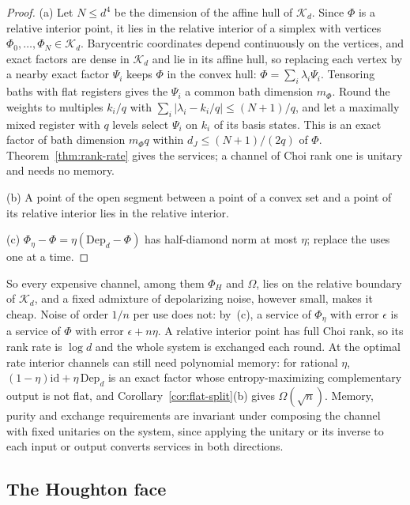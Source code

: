 \documentclass[11pt,a4paper]{article}
\theoremstyle{plain}
\theoremstyle{definition}
\theoremstyle{remark}
\newcommand{\dJ}{d_J}
\begin{document}
\begin{proof}
(a) Let $N\le d^4$ be the dimension of the affine hull of $\mathcal K_d$. Since $\Phi$ is a relative interior point, it lies in the relative
interior of a simplex with vertices $\Phi_0,\dots,\Phi_N\in\mathcal K_d$. Barycentric coordinates depend continuously on the vertices, and exact
factors are dense in $\mathcal K_d$ and lie in its affine hull, so replacing each vertex by a nearby exact factor $\Psi_i$ keeps $\Phi$ in the
convex hull: $\Phi=\sum_i\lambda_i\Psi_i$. Tensoring baths with flat registers gives the $\Psi_i$ a common bath dimension $m_\Phi$. Round the weights
to multiples $k_i/q$ with $\sum_i|\lambda_i-k_i/q|\le(N+1)/q$, and let a maximally mixed register with $q$ levels select $\Psi_i$ on $k_i$ of its basis
states. This is an exact factor of bath dimension $m_\Phi q$ within $\dJ\le(N+1)/(2q)$ of $\Phi$. Theorem~\ref{thm:rank-rate} gives the services;
a channel of Choi rank one is unitary and needs no memory.

(b) A point of the open segment between a point of a convex set and a point of its relative interior lies in the relative interior.

(c) $\Phi_\eta-\Phi=\eta(\mathrm{Dep}_d-\Phi)$ has half-diamond norm at most $\eta$; replace the uses one at a time.
\end{proof}

So every expensive channel, among them $\Phi_H$ and $\Omega$, lies on the relative boundary of $\mathcal K_d$, and a fixed admixture of
depolarizing noise, however small, makes it cheap. Noise of order $1/n$ per use does not: by~(c), a service of $\Phi_\eta$ with error $\epsilon$ is
a service of $\Phi$ with error $\epsilon+n\eta$. A relative interior point has full Choi rank, so its rank rate is $\log d$ and the whole system is
exchanged each round. At the optimal rate interior channels can still need polynomial memory: for rational $\eta$,
$(1-\eta)\mathrm{id}+\eta\,\mathrm{Dep}_d$ is an exact factor whose entropy-maximizing complementary output is not flat, and
Corollary~\ref{cor:flat-split}(b) gives $\Omega(\sqrt n)$. Memory, purity and exchange requirements are invariant under composing the channel with
fixed unitaries on the system, since applying the unitary or its inverse to each input or output converts services in both directions.

\subsection{The Houghton face}\label{sec:face}
\end{document}
